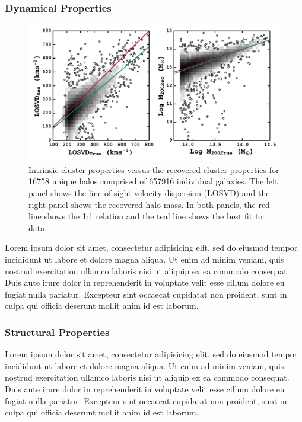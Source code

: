 \documentclass[apj, revtex4]{emulateapj}
\begin{document}
\subsubsection{Dynamical Properties}
\begin{figure} 
	\includegraphics[width=\textwidth]{fullKnowledge.pdf} 
	\caption{Intrinsic cluster properties versus the recovered cluster properties for 16758 unique halos comprised of 657916 individual galaxies. The left panel shows the line of sight velocity dispersion (LOSVD) and the right panel shows the recovered halo mass. In both panels, the red line shows the 1:1 relation and the teal line shows the best fit to data.} 
	\label{fig:full} 
\end{figure}
Lorem ipsum dolor sit amet, consectetur adipisicing elit, sed do eiusmod tempor incididunt ut labore et dolore magna aliqua. Ut enim ad minim veniam, quis nostrud exercitation ullamco laboris nisi ut aliquip ex ea commodo consequat. Duis aute irure dolor in reprehenderit in voluptate velit esse cillum dolore eu fugiat nulla pariatur. Excepteur sint occaecat cupidatat non proident, sunt in culpa qui officia deserunt mollit anim id est laborum.

\subsubsection{Structural Properties}
Lorem ipsum dolor sit amet, consectetur adipisicing elit, sed do eiusmod tempor incididunt ut labore et dolore magna aliqua. Ut enim ad minim veniam, quis nostrud exercitation ullamco laboris nisi ut aliquip ex ea commodo consequat. Duis aute irure dolor in reprehenderit in voluptate velit esse cillum dolore eu fugiat nulla pariatur. Excepteur sint occaecat cupidatat non proident, sunt in culpa qui officia deserunt mollit anim id est laborum.
\end{document}
